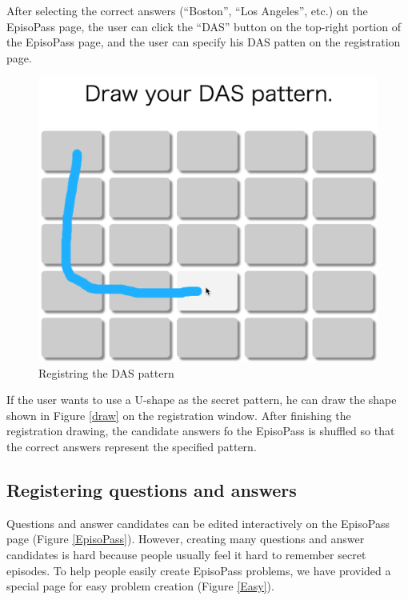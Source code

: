 \documentclass[sigconf]{acmart}
\begin{document}
After selecting the correct answers
(``Boston'', ``Los Angeles'', etc.) on the EpisoPass page,
the user can click the ``DAS'' button on the top-right portion of the
EpisoPass page,
%
and the user can specify his DAS patten on the registration page.

\begin{figure}[H]
  \includegraphics[width=12cm,bb=0 0 1332 1118]{figures/DASRegister.png}
  \caption{Registring the DAS pattern}
  \label{DASRegister}
\end{figure}

If the user wants to use a U-shape as the secret pattern,
he can draw the shape shown in Figure \ref{draw}
on the registration window.
%
After finishing the registration drawing, the candidate answers fo the EpisoPass is
shuffled so that the correct answers represent the specified pattern.

\subsection{Registering questions and answers}

Questions and answer candidates can be edited interactively on the
EpisoPass page (Figure \ref{EpisoPass}).
However, creating many questions and answer candidates is hard because
people usually feel it hard to remember secret episodes.
%
To help people easily create EpisoPass problems,
we have provided a special page for easy problem creation
(Figure \ref{Easy}).
\end{document}
